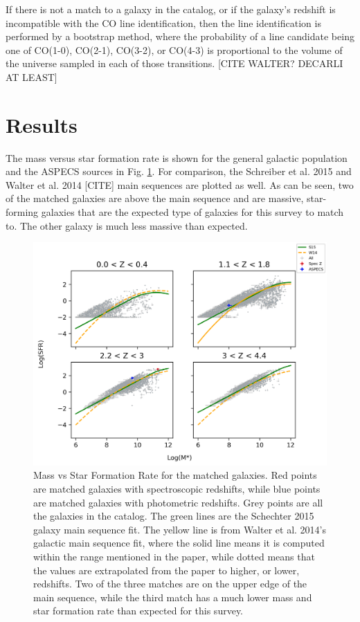If there is not a match to a galaxy in the catalog, or if the galaxy's redshift is incompatible with the CO line identification, then the line identification is performed by a bootstrap method, where the probability of a line candidate being one of CO(1-0), CO(2-1), CO(3-2), or CO(4-3) is proportional to the volume of the universe sampled in each of those transitions. [CITE WALTER? DECARLI AT LEAST] 

\section{Results}

The mass versus star formation rate is shown for the general galactic population and the ASPECS sources in Fig. \ref{fig:Cross_match}. For comparison, the Schreiber et al. 2015 \cite{schreiber2015herschel} and Walter et al. 2014 [CITE] main sequences are plotted as well. As can be seen, two of the matched galaxies are above the main sequence and are massive, star-forming galaxies that are the expected type of galaxies for this survey to match to. The other galaxy is much less massive than expected.

\begin{figure}[tbp]
\centering \includegraphics[width=120mm]{Mstar_vs_SFR_all_closest_sep_1_0_sn_fid_60.png}
\caption{Mass vs Star Formation Rate for the matched galaxies. Red points are matched galaxies with spectroscopic redshifts, while blue points are matched galaxies with photometric redshifts. Grey points are all the galaxies in the catalog. The green lines are the Schechter 2015 galaxy main sequence fit. The yellow line is from Walter et al. 2014's galactic main sequence fit, where the solid line means it is computed within the range mentioned in the paper, while dotted means that the values are extrapolated from the paper to higher, or lower, redshifts. Two of the three matches are on the upper edge of the main sequence, while the third match has a much lower mass and star formation rate than expected for this survey.}
\label{fig:Cross_match}
\end{figure}


